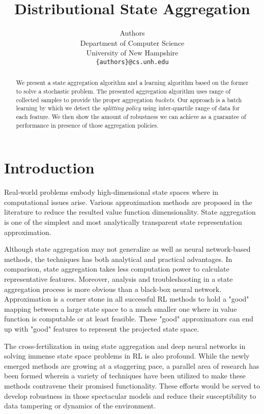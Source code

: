 \documentclass{article}
\title{Distributional State Aggregation}
\author{%
    Authors \\ %
    Department of Computer Science\\
    University of New Hampshire \\
    \texttt{\{authors\}@cs.unh.edu} \\
}
\begin{document}
    \maketitle

    \begin{abstract}
        We present a state aggregation algorithm and a learning algorithm based on the former to solve a stochastic
        problem.
        The presented aggregation algorithm uses range of collected samples to provide the proper aggregation
        \textit{buckets}.
        Our approach is a batch learning by which we detect the \textit{splitting policy} using inter-quartile range
        of data for each feature.
        We then show the amount of robustness we can achieve as a guarantee of performance in presence of those
        aggregation policies.
    \end{abstract}


    \section{Introduction}
    Real-world problems embody high-dimensional state spaces where in computational issues
    arise.
    Various approximation methods are proposed in the literature to reduce the resulted value function
    dimensionality\cite{Sutton1998, Francois-Lavet2018}.
    State aggregation is one of the simplest and most analytically transparent state representation approximation.

    Although state aggregation may not generalize as well as neural network-based methods, the techniques has both
    analytical and practical advantages\cite{Lagoudakis2003}.
    In comparison, state aggregation takes less computation power to calculate representative features.
    Moreover, analysis and troubleshooting in a state aggregation process is more obvious than a black-box neural
    network.
    Approximation is a corner stone in all successful RL methods to hold a "good" mapping between a large state
    space to a much smaller one where in value function is computable or at least feasible.
    These "good" approximators can end up with "good" features to represent the projected state space.

    The cross-fertilization in using state aggregation and deep neural networks in solving immense state
    space problems in RL is also profound.
    While the newly emerged methods are growing at a staggering pace, a parallel area of research has been formed
    wherein a variety of techniques have been utilized to make these methods contravene their promised functionality.
    These efforts would be served to develop robustness in those spectacular models and reduce their
    susceptibility to data tampering or dynamics of the environment.
\end{document}
